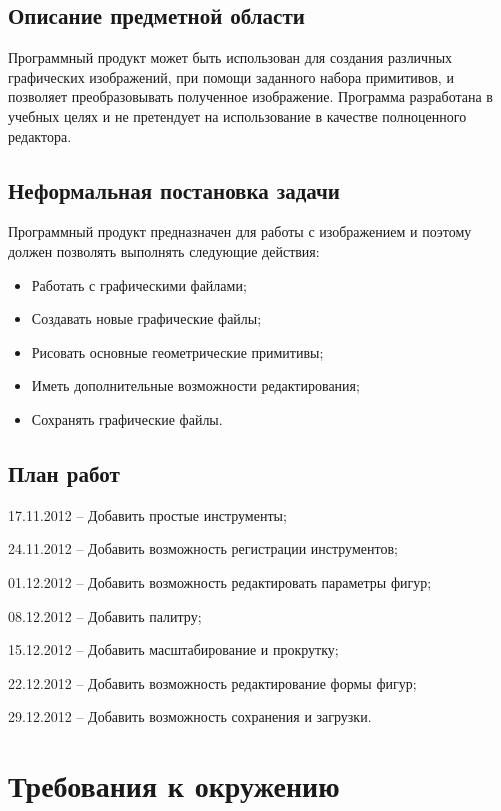 \documentclass[a4paper,12pt]{article}
\begin{document}
\subsection{Описание предметной области}

Программный продукт может быть использован для создания различных графических изображений, при помощи заданного набора примитивов, и позволяет преобразовывать полученное изображение. Программа разработана в учебных целях и не претендует на использование в качестве полноценного редактора.


\subsection{Неформальная постановка задачи}

Программный продукт предназначен для работы с изображением и поэтому должен позволять выполнять следующие действия:

\begin{itemize}
	\item  Работать с графическими файлами;
	\item  Создавать новые графические файлы;
	\item  Рисовать основные геометрические примитивы;
	\item  Иметь дополнительные возможности редактирования;
	\item  Сохранять графические файлы. 
\end{itemize}


\subsection{План работ}
17.11.2012 -- Добавить простые инструменты;

24.11.2012 -- Добавить возможность регистрации инструментов;

01.12.2012 -- Добавить возможность редактировать параметры фигур;

08.12.2012 -- Добавить палитру;

15.12.2012 -- Добавить масштабирование и прокрутку;

22.12.2012 -- Добавить возможность редактирование формы фигур;

29.12.2012 -- Добавить возможность сохранения и загрузки.


\section{Требования к окружению}
\end{document}
